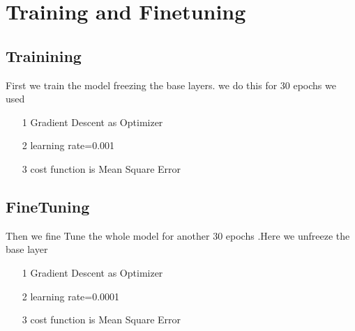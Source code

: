 \documentclass[10pt]{beamer}
\begin{document}
	\section{Training and Finetuning}
		\subsection{Trainining}
			\begin{frame}[fragile]
			First we train the model freezing the base layers. we do this for 30 epochs
			we used
			\begin{itemize}
				\item[1]Gradient Descent  as Optimizer
				\item[2]learning rate=0.001
				\item[3]cost function is Mean Square Error
			\end{itemize}
			
			\end{frame}
		\subsection{FineTuning}
			\begin{frame}
				Then we fine Tune the whole model for another 30 epochs .Here we unfreeze the base layer
				\begin{itemize}
				\item[1]Gradient Descent  as Optimizer
				\item[2]learning rate=0.0001
				\item[3]cost function is Mean Square Error
			\end{itemize}
				
			\end{frame}
\end{document}
